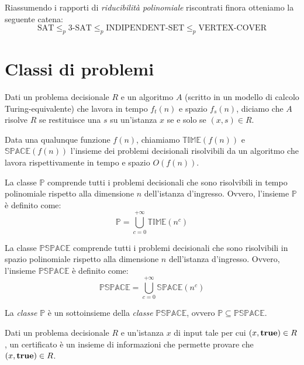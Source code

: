 \noindent
Riassumendo i rapporti di \emph{riducibilità polinomiale} riscontrati finora
otteniamo la seguente catena:
\[\text{SAT}\leq_p\text{3-SAT}\leq_p\text{INDIPENDENT-SET}\leq_p\text{VERTEX-COVER}\]

\section{Classi di problemi}
\begin{definition}[Algoritmo]
    Dati un problema decisionale $R$ e un algoritmo $A$ (scritto in un modello
    di calcolo Turing-equivalente) che lavora in tempo $f_t(n)$ e spazio $f_s(n)$,
    diciamo che $A$ risolve $R$ se restituisce una $s$ su un'istanza $x$ se e solo
    se $(x,s)\in R$.
\end{definition}
\begin{definition}
    Data una qualunque funzione $f(n)$, chiamiamo $\mathbb{TIME}(f(n))$ e
    $\mathbb{SPACE}(f(n))$ l'insieme dei problemi decisionali risolvibili da un
    algoritmo che lavora rispettivamente in tempo e spazio $O(f(n))$.
\end{definition}
\begin{definition}
    La classe $\mathbb{P}$ comprende tutti i problemi decisionali che sono
    risolvibili in tempo polinomiale rispetto alla dimensione $n$ dell'istanza
    d'ingresso. Ovvero, l'insieme $\mathbb{P}$ è definito come:
    \[\mathbb{P}=\bigcup_{c=0}^{+\infty}\mathbb{TIME}(n^c)\]
\end{definition}
\begin{definition}
    La classe $\mathbb{PSPACE}$ comprende tutti i problemi decisionali che sono
    risolvibili in spazio polinomiale rispetto alla dimensione $n$ dell'istanza
    d'ingresso. Ovvero, l'insieme $\mathbb{PSPACE}$ è definito come:
    \[\mathbb{PSPACE}=\bigcup_{c=0}^{+\infty}\mathbb{SPACE}(n^c)\]
\end{definition}
\begin{note}
    La \emph{classe} $\mathbb{P}$ è un sottoinsieme della \emph{classe}
    $\mathbb{PSPACE}$, ovvero $\mathbb{P}\subseteq\mathbb{PSPACE}$.
\end{note}

\begin{definition}[Certificato]
    Dati un problema decisionale $R$ e un'istanza $x$ di input tale per cui
    $(x,{\bf true})\in R$, un certificato è un insieme di informazioni che
    permette provare che $(x,{\bf true})\in R$.
\end{definition}

